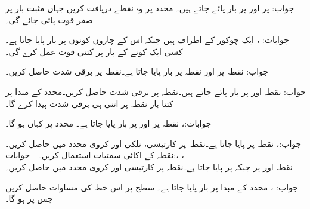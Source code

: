  جواب:
 پر  اور  پر  بار پائے جاتے ہیں۔ محدد پر وہ نقطے دریافت کریں جہاں مثبت بار پر صفر قوت پائی جائے گی۔

جوابات: ، 
ایک چوکور کے اطراف  ہیں جبکہ اس کے چاروں کونوں پر  بار پایا جاتا ہے۔کسی ایک کونے کے بار پر کتنی قوت عمل کرے گی۔

جواب:
نقطہ  پر  اور نقطہ  پر  بار پایا جاتا ہے۔نقطہ  پر برقی شدت  حاصل کریں۔

جواب:
نقطہ  اور  پر  بار پائے جاتے ہیں۔نقطہ  پر برقی شدت  حاصل کریں۔محدد کے مبدا پر کتنا بار نقطہ  پر اتنی ہی برقی شدت پیدا کرے گا۔

جوابات:، 
نقطہ  پر  اور  پر  بار پایا جاتا ہے۔ محدد پر کہاں  ہو گا۔

جواب:، 
نقطہ  پر  پایا جاتا ہے۔نقطہ  پر کارتیسی، نلکی اور کروی  محدد میں  حاصل کریں۔نقطہ  کے اکائی سمتیات استعمال کریں۔
-
جوابات:، ، \\
نقطہ  اور  پر  جبکہ  پر  پایا جاتا ہے۔نقطہ  پر کارتیسی اور کروی محدد میں  حاصل کریں۔

جواب: ، 
محدد کے مبدا پر  بار پایا جاتا ہے۔ سطح  پر اس خط کی مساوات حاصل کریں جس پر  ہو گا۔

